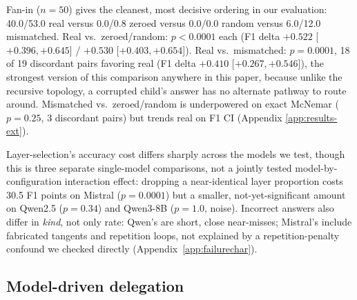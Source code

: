 \documentclass[11pt]{article}
\begin{document}
Fan-in ($n=50$) gives the cleanest, most decisive ordering in our
evaluation: 40.0/53.0 real versus 0.0/0.8 zeroed versus 0.0/0.0 random
versus 6.0/12.0 mismatched. Real vs.\ zeroed/random: $p<0.0001$ each
(F1 delta $+0.522$ [$+0.396,+0.645$] / $+0.530$ [$+0.403,+0.654$]).
Real vs.\ mismatched: $p=0.0001$, 18 of 19 discordant pairs favoring
real (F1 delta $+0.410$ [$+0.267,+0.546$]), the strongest version of
this comparison anywhere in this
paper, because unlike the recursive topology, a corrupted child's
answer has no alternate pathway to route around. Mismatched
vs.\ zeroed/random is underpowered on exact McNemar ($p=0.25$, 3
discordant pairs) but trends real on F1 CI (Appendix
\ref{app:results-ext}).

Layer-selection's accuracy cost differs sharply across the models we
test, though this is three separate single-model comparisons, not a
jointly tested model-by-configuration interaction effect: dropping a
near-identical layer proportion costs 30.5 F1 points on Mistral
($p=0.0001$) but a smaller, not-yet-significant amount on Qwen2.5
($p=0.34$) and Qwen3-8B ($p=1.0$, noise). Incorrect answers
also differ in \emph{kind}, not only rate: Qwen's are short, close
near-misses; Mistral's include fabricated tangents and repetition
loops, not explained by a repetition-penalty confound we checked
directly (Appendix~\ref{app:failurechar}).

\subsection{Model-driven delegation}
\end{document}
